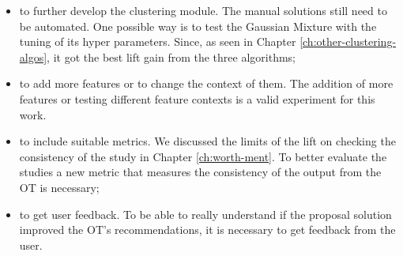 \begin{itemize}
    \item to further develop the clustering module. The manual solutions still need to be automated. One possible way is to test the Gaussian Mixture with the tuning of its hyper parameters. Since, as seen in Chapter \ref{ch:other-clustering-algos}, it got the best lift gain from the three algorithms;
    \item to add more features or to change the context of them. The addition of more features or testing different feature contexts is a valid experiment for this work. 
    \item to include suitable metrics. We discussed the limits of the lift on checking the consistency of the study in Chapter \ref{ch:worth-ment}. To better evaluate the studies a new metric that measures the consistency of the output from the OT is necessary;
    \item to get user feedback. To be able to really understand if the proposal solution improved the OT's recommendations, it is necessary to get feedback from the user.
\end{itemize}
